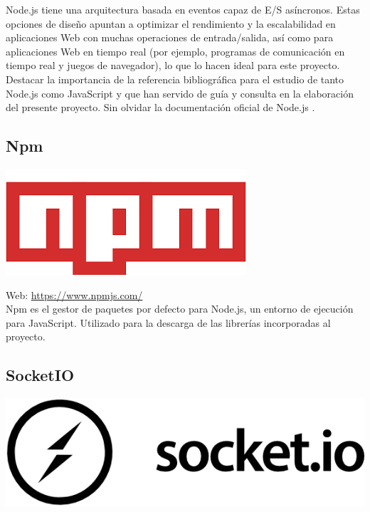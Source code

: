 Node.js tiene una arquitectura basada en eventos capaz de E/S asíncronos. Estas opciones de diseño apuntan a optimizar el rendimiento y la escalabilidad en aplicaciones Web con muchas operaciones de entrada/salida, así como para aplicaciones Web en tiempo real (por ejemplo, programas de comunicación en tiempo real y juegos de navegador), lo que lo hacen ideal para este proyecto.\\

Destacar la importancia de la referencia bibliográfica \cite{book:javascript} para el estudio de tanto Node.js como JavaScript y que han servido de guía y consulta en la elaboración del presente proyecto. 
Sin olvidar la documentación oficial de Node.js \cite{website:4}.\\

\subsection{Npm}

\begin{center}
\includegraphics[scale=0.4]{imagenes/npm-logo.png}
\end{center}

Web: \url{https://www.npmjs.com/}\\

Npm es el gestor de paquetes por defecto para Node.js, un entorno de ejecución para JavaScript. Utilizado para la descarga de las librerías incorporadas al proyecto.


\subsection{SocketIO}

\begin{center}
\includegraphics[scale=0.3]{imagenes/socketio-logo.png}
\end{center}

